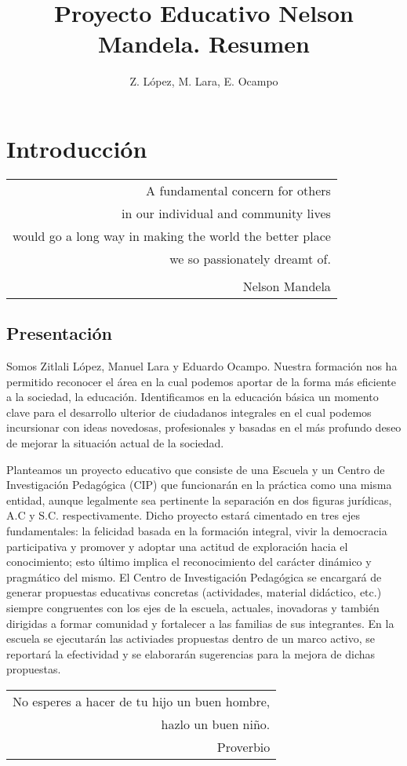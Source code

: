 \documentclass[10pt,letterpaper]{report}
\author{Z. López, M. Lara, E. Ocampo}
\title{Proyecto Educativo Nelson Mandela. Resumen}
\makeatletter
\newenvironment{myepigraph}
  {\par\hfill\itshape
   \begin{tabular}{@{}r@{\hspace{2em}}}} %
  {\end{tabular}\par\medskip}
\makeatother
\begin{document}
\maketitle


\chapter{Introducción}

\begin{myepigraph}A fundamental concern for others\\
in our individual and community lives\\
would go a long way in making the world the better place\\
we so passionately dreamt of.\\
\\
Nelson Mandela
\end{myepigraph}

\section{Presentación}

Somos Zitlali López, Manuel Lara y Eduardo Ocampo. Nuestra formación nos ha permitido reconocer el área en la cual podemos aportar de la forma más eficiente a la sociedad, la educación. Identificamos en la educación básica un momento clave para el desarrollo ulterior de ciudadanos integrales en el cual podemos incursionar con ideas novedosas, profesionales y basadas en el más profundo deseo de mejorar la situación actual de la sociedad.

Planteamos un proyecto educativo que consiste de una Escuela y un Centro de Investigación Pedagógica (CIP) que funcionarán en la práctica como una misma entidad, aunque legalmente sea pertinente la separación en dos figuras jurídicas, A.C y S.C. respectivamente. Dicho proyecto estará cimentado en tres ejes fundamentales: la felicidad basada en la formación integral, vivir la democracia participativa y promover y adoptar una actitud de exploración hacia el conocimiento; esto último implica el reconocimiento del carácter dinámico y pragmático del mismo. El Centro de Investigación Pedagógica se encargará de generar propuestas educativas concretas (actividades, material didáctico, etc.) siempre congruentes con los ejes de la escuela, actuales, inovadoras y también dirigidas a formar comunidad y fortalecer a las familias de sus integrantes. En la escuela se ejecutarán las activiades propuestas dentro de un marco activo, se reportará la efectividad y se elaborarán sugerencias para la mejora de dichas propuestas.
\vspace{1cm}
\begin{myepigraph}No esperes a hacer de tu hijo un buen hombre,\\
hazlo un buen niño.\\Proverbio
\end{myepigraph}
\end{document}
